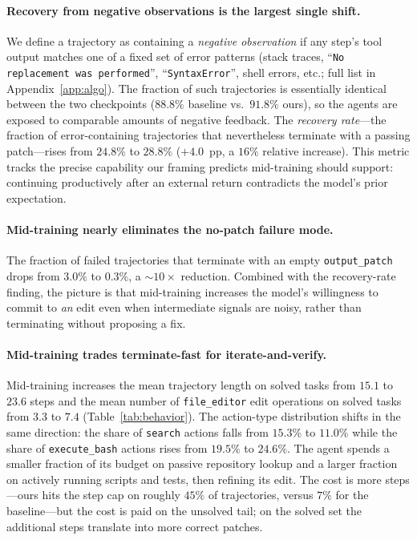 \paragraph{Recovery from negative observations is the largest single shift.}
We define a trajectory as containing a \emph{negative observation} if any
step's tool output matches one of a fixed set of error patterns (stack
traces, ``\texttt{No replacement was performed}'', ``\texttt{SyntaxError}'',
shell errors, etc.; full list in Appendix~\ref{app:algo}). The fraction of
such trajectories is essentially identical between the two checkpoints
($88.8\%$ baseline vs.\ $91.8\%$ ours), so the agents are exposed to
comparable amounts of negative feedback. The \emph{recovery rate}---the
fraction of error-containing trajectories that nevertheless terminate with a
passing patch---rises from $24.8\%$ to $28.8\%$ ($+4.0$~pp, a $16\%$
relative increase). This metric tracks the precise capability our framing
predicts mid-training should support: continuing productively after an
external return contradicts the model's prior expectation.

\paragraph{Mid-training nearly eliminates the no-patch failure mode.}
The fraction of failed trajectories that terminate with an empty
\texttt{output\_patch} drops from $3.0\%$ to $0.3\%$, a $\sim 10\times$
reduction. Combined with the recovery-rate finding, the picture is that
mid-training increases the model's willingness to commit to \emph{an} edit
even when intermediate signals are noisy, rather than terminating without
proposing a fix.

\paragraph{Mid-training trades terminate-fast for iterate-and-verify.}
Mid-training increases the mean trajectory length on solved tasks from
$15.1$ to $23.6$ steps and the mean number of \texttt{file\_editor} edit
operations on solved tasks from $3.3$ to $7.4$ (Table~\ref{tab:behavior}).
The action-type distribution shifts in the same direction: the share of
\texttt{search} actions falls from $15.3\%$ to $11.0\%$ while the share of
\texttt{execute\_bash} actions rises from $19.5\%$ to $24.6\%$. The agent
spends a smaller fraction of its budget on passive repository lookup and a
larger fraction on actively running scripts and tests, then refining its
edit. The cost is more steps---ours hits the step cap on roughly $45\%$ of
trajectories, versus $7\%$ for the baseline---but the cost is paid on the
unsolved tail; on the solved set the additional steps translate into more
correct patches.

